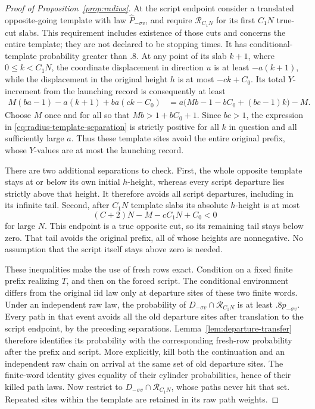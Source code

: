 \begin{proof}[Proof of Proposition~\ref{prop:radius}]
At the script endpoint consider a translated opposite-going template
with law \(\widehat P_{-\sigma v}\), and require
\(\mathcal R_{C_1N}\) for its first \(C_1N\) true-cut slabs.
This requirement includes existence of those cuts and concerns the
entire template; they are not declared to be stopping times.  It has
conditional-template probability greater than \(.8\).  At any point
of its slab \(k+1\), where \(0\le k<C_1N\), the coordinate
displacement in direction \(u\) is at least \(-a(k+1)\), while
the displacement in the original height \(h\) is at most
\(-ck+C_0\).  Its total \(Y\)-increment from the launching record
is consequently at least
\begin{equation}\label{eq:radius-template-separation}
 \begin{split}
 M(ba-1)-a(k+1)+ba(ck-C_0)
 &=a\bigl(Mb-1-bC_0+(bc-1)k\bigr)-M.
 \end{split}
\end{equation}
Choose \(M\) once and for all so that \(Mb>1+bC_0+1\).
Since \(bc>1\), the expression in
\eqref{eq:radius-template-separation} is strictly positive for all
\(k\) in question and all sufficiently large \(a\).  Thus these
template sites avoid the entire original prefix, whose \(Y\)-values
are at most the launching record.

There are two additional separations to check.  First, the whole
opposite template stays at or below its own initial \(h\)-height,
whereas every script departure lies strictly above that height.
It therefore avoids all script departures, including in its infinite
tail.  Second, after \(C_1N\) template slabs its absolute
\(h\)-height is at most
\[
 (C+2)N-M-cC_1N+C_0<0
\]
for large \(N\).  This endpoint is a true opposite cut, so its
remaining tail stays below zero.  That tail avoids the original
prefix, all of whose heights are nonnegative.  No assumption that
the script itself stays above zero is needed.

These inequalities make the use of fresh rows exact.  Condition on a
fixed finite prefix realizing \(T\), and then on the forced script.
The conditional environment differs from the original iid law only
at departure sites of these two finite words.  Under an independent
raw law, the probability of
\(D_{-\sigma v}\cap\mathcal R_{C_1N}\) is at least
\(.8p_{-\sigma v}\).  Every path in that event avoids all the old
departure sites after translation to the script endpoint, by the
preceding separations.  Lemma~\ref{lem:departure-transfer} therefore
identifies its probability with the corresponding fresh-row
probability after the prefix and script.  More explicitly, kill both
the continuation and an independent raw chain on arrival at the same
set of old departure sites.  The finite-word identity gives equality
of their cylinder probabilities, hence of their killed path laws.
Now restrict to \(D_{-\sigma v}\cap\mathcal R_{C_1N}\), whose paths
never hit that set.  Repeated sites within the template are retained
in its raw path weights.


\end{proof}
